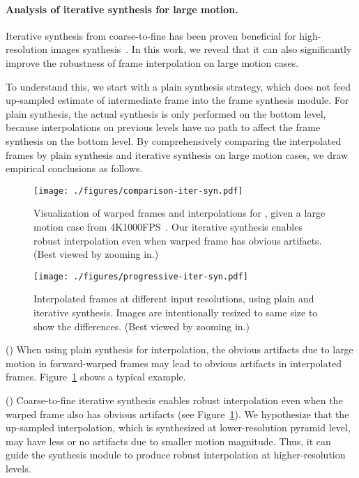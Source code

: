 \documentclass[10pt,twocolumn,letterpaper]{article}
\begin{document}
\paragraph{Analysis of iterative synthesis for large
motion.}\label{sec:analysis-iter} Iterative synthesis from coarse-to-fine has
been proven beneficial for high-resolution images
synthesis~\cite{chen2017photographic}. In this work, we reveal that it can also
significantly improve the robustness of frame interpolation on large motion
cases.

To understand this, we start with a plain synthesis strategy, which does not
feed up-sampled estimate of intermediate frame into the frame synthesis module.
For plain synthesis, the actual synthesis is only performed on the bottom level,
because interpolations on previous levels have no path to affect
the frame synthesis on the bottom level. By comprehensively comparing the
interpolated frames by plain synthesis and iterative synthesis on large motion
cases, we draw empirical conclusions as follows.


\begin{figure}[tb]
\centering
\texttt{[image: ./figures/comparison-iter-syn.pdf]}
\caption{Visualization of warped frames and interpolations for , given a
    large motion case from 4K1000FPS~\cite{sim2021xvfi}. Our iterative synthesis
    enables robust interpolation even when warped frame has obvious artifacts.
    (Best viewed by zooming in.)
}
\vspace{-0.25cm}
\label{fig:comp-iter-syn}
\end{figure}



\begin{figure}[tb]
\centering
\texttt{[image: ./figures/progressive-iter-syn.pdf]}
\caption{Interpolated frames at different input resolutions, using plain and
    iterative synthesis. Images are intentionally resized to same size to show
    the differences. (Best viewed by zooming in.)
}
\vspace{-0.25cm}
\label{fig:progressive-iter-syn}
\end{figure}


() When using plain synthesis for interpolation, the obvious
artifacts due to large motion in forward-warped frames may lead to obvious
artifacts in interpolated frames. Figure~\ref{fig:comp-iter-syn} shows a typical
example.


() Coarse-to-fine iterative synthesis enables robust interpolation
even when the warped frame also has obvious artifacts (see
Figure~\ref{fig:comp-iter-syn}). We hypothesize that the up-sampled
interpolation, which is synthesized at lower-resolution pyramid level, may have
less or no artifacts due to smaller motion magnitude. Thus, it can guide the
synthesis module to produce robust interpolation at higher-resolution levels.
\end{document}
